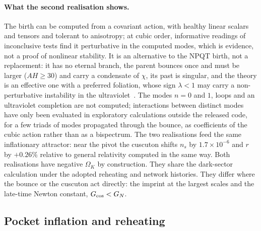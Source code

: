 \documentclass[11pt,a4paper]{article}
\begin{document}
\paragraph{What the second realisation shows.}
The birth can be computed from a covariant action, with healthy linear scalars and tensors and tolerant to anisotropy; at cubic order, informative readings of inconclusive tests find it perturbative in the computed modes, which is evidence, not a proof of nonlinear stability. It is an alternative to the NPQT birth, not a replacement: it has no eternal branch, the parent bounces once and must be larger ($AH\ge30$) and carry a condensate of $\chi$, its past is singular, and the theory is an effective one with a preferred foliation, whose sign $\lambda<1$ may carry a non-perturbative instability in the ultraviolet~\cite{Afshordi2009}. The modes $n=0$ and $1$, loops and an ultraviolet completion are not computed; interactions between distinct modes have only been evaluated in exploratory calculations outside the released code, for a few triads of modes propagated through the bounce, as coefficients of the cubic action rather than as a bispectrum.
The two realisations feed the same inflationary attractor: near the pivot the cuscuton shifts $n_s$ by $1.7\times10^{-6}$ and $r$ by $+0.26\%$ relative to general relativity computed in the same way. Both realisations have negative $\Omega_K$ by construction. They share the dark-sector calculation under the adopted reheating and network histories. They differ where the bounce or the cuscuton act directly: the imprint at the largest scales and the late-time Newton constant, $G_{\rm cos}<G_N$.

\subsection{Pocket inflation and reheating}
\label{sec:pocket}
\end{document}
